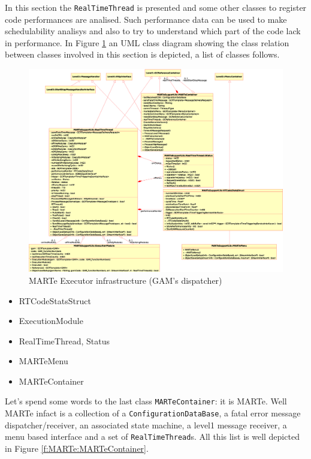 In this section the \texttt{RealTimeThread} is presented and some other classes to register code performances are analised. Such performance data can be used to make schedulability analisys and also to try to understand which part of the code lack in performance. In Figure \ref{f:MARTe:Support} an UML class diagram showing the class relation between classes involved in this section is depicted, a list of classes follows. \\

\begin{figure}[h!]
 \begin{center}
  \includegraphics[width=\textwidth]{MARTe/MARTe-Support.eps}
  \caption{MARTe Executor infrastructure (GAM's dispatcher)}
  \label{f:MARTe:Support}
 \end{center}
\end{figure}

\begin{itemize}
 \item RTCodeStatsStruct
 \item ExecutionModule
 \item RealTimeThread, Status
 \item MARTeMenu
 \item MARTeContainer
\end{itemize}


Let's spend some words to the last class \texttt{MARTeContainer}: it is MARTe. Well MARTe infact is a collection of a \texttt{ConfigurationDataBase}, a fatal error message dispatcher/receiver, an associated state machine, a level1 message receiver, a menu based interface and a set of \texttt{RealTimeThread}s. All this list is well depicted in Figure \ref{f:MARTe:MARTeContainer}.

